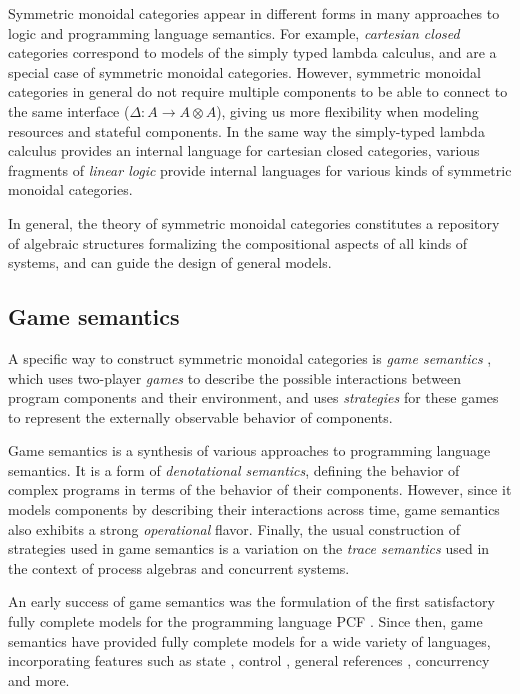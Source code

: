 \documentclass[11pt,oneside]{book}
\theoremstyle{definition}
\begin{document}
Symmetric monoidal categories appear in different forms
in many approaches to logic and programming language semantics.
For example,
\emph{cartesian closed} categories
correspond
to models of the simply typed lambda calculus,
and are a special case of symmetric monoidal categories.
However,
symmetric monoidal categories in general do not require
multiple components to be able to connect to the same interface
($\Delta : A \rightarrow A \otimes A$),
giving us more flexibility when modeling resources
and stateful components.
In the same way the simply-typed lambda calculus provides
an internal language for cartesian closed categories,
various fragments of \emph{linear logic} provide
internal languages for various kinds of symmetric monoidal categories.

In general,
the theory of symmetric monoidal categories
constitutes a repository of algebraic structures
formalizing the compositional aspects of
all kinds of systems,
and can guide the design
of general models.


\subsection{Game semantics} %

A specific way to construct symmetric monoidal categories
is \emph{game semantics} \citep{cspgs},
which uses two-player \emph{games} to describe
the possible interactions between
program components and their environment,
and uses \emph{strategies} for these games
to represent the externally observable behavior
of components.

Game semantics is a synthesis
of various approaches to programming language semantics.
It is a form of \emph{denotational semantics},
defining the behavior of complex programs
in terms of the behavior of their components.
However,
since it models components
by describing their interactions across time,
game semantics also exhibits a strong \emph{operational} flavor.
Finally,
the usual construction of strategies used in game semantics
is a variation on the \emph{trace semantics}
used in the context of process algebras
and concurrent systems.

An early success of game semantics
was the formulation of the first satisfactory
fully complete models for
the programming language PCF \citep{pcfajm,pcfho}.
Since then,
game semantics have provided fully complete models
for a wide variety of languages,
incorporating features such as
state \citep{gsia},
control \citep{gscontrol},
general references \citep{gsgr},
concurrency \citep{gsconcur}
and more.
\end{document}
